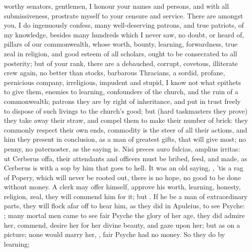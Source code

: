 {worthy senators, gentlemen, I honour your names and persons, and with
all submissiveness, prostrate myself to your censure and service. There
are amongst you, I do ingenuously confess, many well-deserving patrons,
and true patriots, of my knowledge, besides many hundreds which I never
saw, no doubt, or heard of, pillars of our commonwealth, whose
worth, bounty, learning, forwardness, true zeal in religion, and good
esteem of all scholars, ought to be consecrated to all posterity; but
of your rank, there are a debauched, corrupt, covetous, illiterate crew
again, no better than stocks,  barbarous Thracians,  a sordid, profane, pernicious company,
irreligious, impudent and stupid, I know not what epithets to give
them, enemies to learning, confounders of the church, and the ruin of a
commonwealth; patrons they are by right of inheritance, and put in
trust freely to dispose of such livings to the church's good; but (hard
taskmasters they prove) they take away their straw, and compel them to
make their number of brick: they commonly respect their own ends,
commodity is the steer of all their actions, and him they present in
conclusion, as a man of greatest gifts, that will give most; no penny,
no paternoster, as the saying is. Nisi preces auro fulcias,
amplius irritas: ut Cerberus offa, their attendants and officers must
be bribed, feed, and made, as Cerberus is with a sop by him that goes
to hell. It was an old saying, , 'tis a rag of Popery, which will never be rooted out,
there is no hope, no good to be done without money. A clerk may offer
himself, approve his worth, learning, honesty, religion, zeal,
they will commend him for it; but . If
he be a man of extraordinary parts, they will flock afar off to hear
him, as they did in Apuleius, to see Psyche: ; many mortal men came to see fair
Psyche the glory of her age, they did admire her, commend, desire her
for her divine beauty, and gaze upon her; but as on a picture; none
would marry her, , fair Psyche had no money. So they
do by learning;

}
